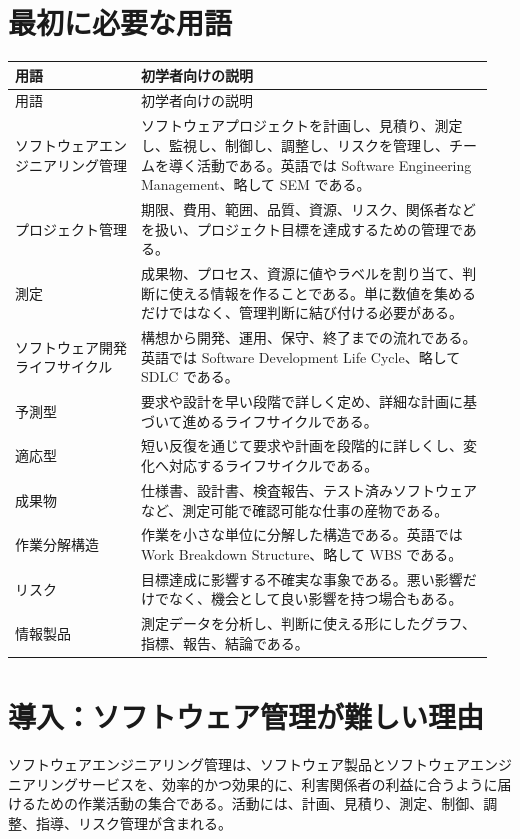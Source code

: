 \documentclass[a4paper,11pt]{ltjsarticle}
\begin{document}
\section{最初に必要な用語}
\begin{longtable}{>{\raggedright\arraybackslash}p{0.25\linewidth}>{\raggedright\arraybackslash}p{0.70\linewidth}}
\toprule
用語 & 初学者向けの説明 \\
\midrule
\endfirsthead
\toprule
用語 & 初学者向けの説明 \\
\midrule
\endhead
ソフトウェアエンジニアリング管理 & ソフトウェアプロジェクトを計画し、見積り、測定し、監視し、制御し、調整し、リスクを管理し、チームを導く活動である。英語では Software Engineering Management、略して SEM である。 \\
プロジェクト管理 & 期限、費用、範囲、品質、資源、リスク、関係者などを扱い、プロジェクト目標を達成するための管理である。 \\
測定 & 成果物、プロセス、資源に値やラベルを割り当て、判断に使える情報を作ることである。単に数値を集めるだけではなく、管理判断に結び付ける必要がある。 \\
ソフトウェア開発ライフサイクル & 構想から開発、運用、保守、終了までの流れである。英語では Software Development Life Cycle、略して SDLC である。 \\
予測型 & 要求や設計を早い段階で詳しく定め、詳細な計画に基づいて進めるライフサイクルである。 \\
適応型 & 短い反復を通じて要求や計画を段階的に詳しくし、変化へ対応するライフサイクルである。 \\
成果物 & 仕様書、設計書、検査報告、テスト済みソフトウェアなど、測定可能で確認可能な仕事の産物である。 \\
作業分解構造 & 作業を小さな単位に分解した構造である。英語では Work Breakdown Structure、略して WBS である。 \\
リスク & 目標達成に影響する不確実な事象である。悪い影響だけでなく、機会として良い影響を持つ場合もある。 \\
情報製品 & 測定データを分析し、判断に使える形にしたグラフ、指標、報告、結論である。 \\
\bottomrule
\end{longtable}

\section{導入：ソフトウェア管理が難しい理由}
ソフトウェアエンジニアリング管理は、ソフトウェア製品とソフトウェアエンジニアリングサービスを、効率的かつ効果的に、利害関係者の利益に合うように届けるための作業活動の集合である。活動には、計画、見積り、測定、制御、調整、指導、リスク管理が含まれる。
\end{document}
